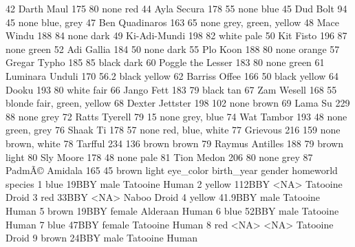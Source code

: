 \documentclass [a4paper] {article}
\begin{document}
\begin{Schunk}
\begin{Soutput}
42            Darth Maul    175    80          none                 red
44           Ayla Secura    178    55          none                blue
45              Dud Bolt     94    45          none          blue, grey
47        Ben Quadinaros    163    65          none grey, green, yellow
48            Mace Windu    188    84          none                dark
49          Ki-Adi-Mundi    198    82         white                pale
50             Kit Fisto    196    87          none               green
52            Adi Gallia    184    50          none                dark
55              Plo Koon    188    80          none              orange
57          Gregar Typho    185    85         black                dark
60     Poggle the Lesser    183    80          none               green
61       Luminara Unduli    170  56.2         black              yellow
62         Barriss Offee    166    50         black              yellow
64                 Dooku    193    80         white                fair
66            Jango Fett    183    79         black                 tan
67            Zam Wesell    168    55        blonde fair, green, yellow
68       Dexter Jettster    198   102          none               brown
69               Lama Su    229    88          none                grey
72         Ratts Tyerell     79    15          none          grey, blue
74            Wat Tambor    193    48          none         green, grey
76              Shaak Ti    178    57          none    red, blue, white
77              Grievous    216   159          none        brown, white
78               Tarfful    234   136         brown               brown
79       Raymus Antilles    188    79         brown               light
80             Sly Moore    178    48          none                pale
81            Tion Medon    206    80          none                grey
87        PadmÃ© Amidala    165    45         brown               light
       eye_color birth_year        gender      homeworld        species
1           blue      19BBY          male       Tatooine          Human
2         yellow     112BBY          <NA>       Tatooine          Droid
3            red      33BBY          <NA>          Naboo          Droid
4         yellow    41.9BBY          male       Tatooine          Human
5          brown      19BBY        female       Alderaan          Human
6           blue      52BBY          male       Tatooine          Human
7           blue      47BBY        female       Tatooine          Human
8            red       <NA>          <NA>       Tatooine          Droid
9          brown      24BBY          male       Tatooine          Human

\end{Soutput}
\end{Schunk}
\end{document}
